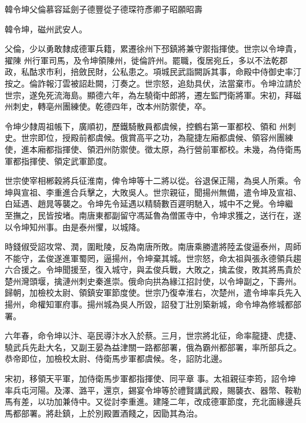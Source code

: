 
\begin{pinyinscope}

 韓令坤父倫慕容延劍子德豐從子德琛符彥卿子昭願昭壽



 韓令坤，磁州武安人。



 父倫，少以勇敢隸成德軍兵籍，累遷徐州下邳鎮將兼守禦指揮使。世宗以令坤貴，擢陳
 州行軍司馬，及令坤領陳州，徙倫許州。罷職，復居宛丘，多以不法乾郡政，私酤求市利，掊斂民財，公私患之。項城民武詣闕訴其事，命殿中侍御史率汀按之。倫詐報汀雲被詔赴闕，汀奏之。世宗怒，追劾具伏，法當棄市。令坤泣請於世宗，遂免死流海島。顯德六年，為左驍衛中郎將，遷左監門衛將軍。宋初，拜磁州刺史，轉亳州團練使。乾德四年，改本州防禦使，卒。



 令坤少隸周祖帳下，廣順初，歷鐵騎散員都虞候，控鶴右第一軍都校、領和
 州刺史。世宗即位，授殿前都虞候。俄賞高平之功，為龍捷左廂都虞候、領容州團練使，進本廂都指揮使、領泗州防禦使。徵太原，為行營前軍都校。未幾，為侍衛馬軍都指揮使、領定武軍節度。



 世宗使宰相郴穀將兵征淮南，俾令坤等十二將以從。谷退保正陽，為吳人所乘。令坤與宣祖、李重進合兵擊之，大敗吳人。世宗親征，聞揚州無備，遣令坤及宣祖、白延遇、趙晁等襲之。令坤先令延遇以精騎數百遲明馳入，城中不之覺。令坤繼
 至撫之，民皆按堵。南唐東都副留守馮延魯為僧匿寺中，令坤求獲之，送行在，遂以令坤知州事。由是泰州懼，以城降。



 時錢俶受詔攻常、潤，圍毗陵，反為南唐所敗。南唐乘勝遣將陸孟俊逼泰州，周師不能守，孟俊遂進軍蜀罔，逼揚州，令坤棄其城。世宗怒，命太祖與張永德領兵趨六合援之。令坤聞援至，復入城守，與孟俊兵戰，大敗之，擒孟俊，敗其將馬貴於楚州灣頭堰，擒漣州刺史秦進崇。俄命向拱為緣江招討使，以令坤副之，下壽州。
 歸朝，加檢校太尉、領鎮安軍節度使。世宗乃復幸淮右，次楚州，遣令坤率兵先入揚州，命權知軍府事。揚州城為吳人所毀，詔發丁壯別築新城，命令坤為修城都部署。



 六年春，命令坤以汴、亳民導汴水入於蔡。三月，世宗將北征，命率龍捷、虎捷、驍武兵先赴大名，又副王晏為益津關一路都部署，俄為霸州都部署，率所部兵之。恭帝即位，加檢校太尉、侍衛馬步軍都虞候。冬，詔防北邊。



 宋初，移領天平軍，加侍衛馬步軍都指揮使、同平章
 事。太祖親征李筠，詔令坤率兵屯河陽。及澤、潞平，還京，錫宴令坤等於禮賢講武殿，賜襲衣、器幣、鞍勒馬有差，以功加兼侍中。又從討李重進。建隆二年，改成德軍節度，充北面緣邊兵馬都部署。將赴鎮，上於別殿置酒餞之，因勖其為治。




\end{pinyinscope}
